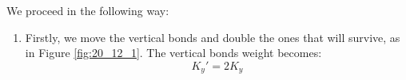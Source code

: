 \documentclass[../main/main.tex]{subfiles}
\begin{document}
We proceed in the following way:
\begin{enumerate}
\item Firstly, we move the vertical bonds and double the ones that will survive, as in Figure \ref{fig:20_12_1}. The vertical bonds weight becomes:
\begin{equation*}
  K_y' = 2 K_y
\end{equation*}


\begin{figure}[h!]
\begin{minipage}[c]{0.5\linewidth}
\end{minipage}
\begin{minipage}[]{0.5\linewidth}
\centering
{}
\end{minipage}
\caption{\label{fig:20_12} }
\end{figure}


\end{enumerate}
\end{document}
